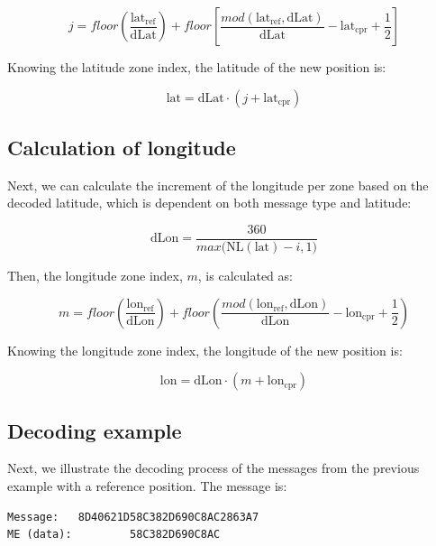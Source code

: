 \begin{equation}
  j = floor \left( \frac{\mathrm{lat}_\mathrm{ref}}{\mathrm{dLat}} \right) + floor \left[ \frac{mod(\mathrm{lat}_\mathrm{ref}, \mathrm{dLat})}{\mathrm{dLat}}  - \mathrm{lat}_\mathrm{cpr}  + \frac{1}{2} \right]
\end{equation}

Knowing the latitude zone index, the latitude of the new position is:

\begin{equation}
  \mathrm{lat} = \mathrm{dLat} \cdot (j + \mathrm{lat}_\mathrm{cpr})
\end{equation}


\subsection{Calculation of longitude}

Next, we can calculate the increment of the longitude per zone based on the decoded latitude, which is dependent on both message type and latitude:

\begin{equation}
  \mathrm{dLon} = \frac{360}{max\Big( \mathrm{NL}(\mathrm{lat})-i, 1 \Big)}
\end{equation}


Then, the longitude zone index, $m$, is calculated as:

\begin{equation}
  m = floor \left( \frac{\mathrm{lon}_\mathrm{ref}}{\mathrm{dLon}} \right) + floor \left( \frac{mod(\mathrm{lon}_\mathrm{ref}, \mathrm{dLon})}{\mathrm{dLon}}  - \mathrm{lon}_\mathrm{cpr}  + \frac{1}{2}  \right)
\end{equation}

Knowing the longitude zone index, the longitude of the new position is:

\begin{equation}
  \mathrm{lon} = \mathrm{dLon} \cdot (m + \mathrm{lon}_\mathrm{cpr})
\end{equation}


\subsection{Decoding example}

Next, we illustrate the decoding process of the messages from the previous example with a reference position. The message is:

\begin{verbatim}
Message:   8D40621D58C382D690C8AC2863A7
ME (data):         58C382D690C8AC
\end{verbatim}

